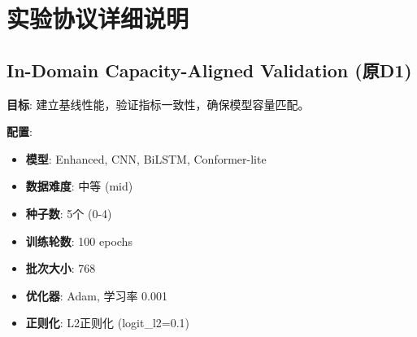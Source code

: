 \section{实验协议详细说明}

\subsection{In-Domain Capacity-Aligned Validation (原D1)}
\textbf{目标}: 建立基线性能，验证指标一致性，确保模型容量匹配。

\textbf{配置}:
\begin{itemize}
    \item \textbf{模型}: Enhanced, CNN, BiLSTM, Conformer-lite
    \item \textbf{数据难度}: 中等 (mid)
    \item \textbf{种子数}: 5个 (0-4)
    \item \textbf{训练轮数}: 100 epochs
    \item \textbf{批次大小}: 768
    \item \textbf{优化器}: Adam, 学习率 0.001
    \item \textbf{正则化}: L2正则化 (logit\_l2=0.1)
\end{itemize}